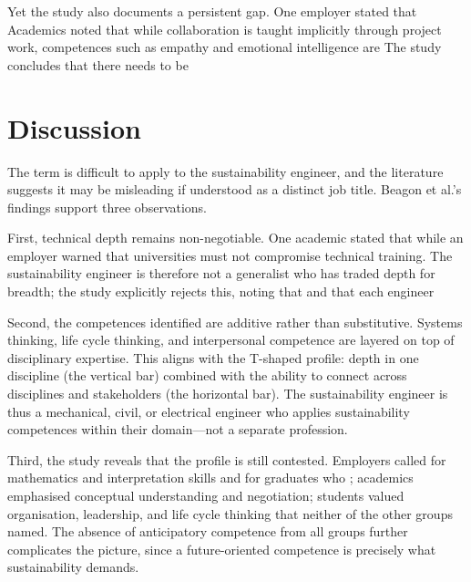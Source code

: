 \documentclass[11pt, a4paper]{article}
\begin{document}
Yet the study also documents a persistent gap. One employer stated that Academics noted that while
collaboration is taught implicitly through project work, competences such as empathy and emotional
intelligence are 
The study concludes that there needs to be 

\section{Discussion}
The term  is difficult to apply to the sustainability engineer, and the literature
suggests it may be misleading if understood as a distinct job title. Beagon et al.'s findings support
three observations.

First, technical depth remains non-negotiable. One academic stated that  while an employer warned that universities must not compromise technical training. The
 sustainability engineer is therefore not a generalist who has traded depth for
breadth; the study explicitly rejects this, noting that 
and that each engineer 

Second, the competences identified are additive rather than substitutive. Systems thinking, life
cycle thinking, and interpersonal competence are layered on top of disciplinary expertise. This
aligns with the T-shaped profile: depth in one discipline (the vertical bar) combined with the
ability to connect across disciplines and stakeholders (the horizontal bar). The 
sustainability engineer is thus a mechanical, civil, or electrical engineer who applies
sustainability competences within their domain—not a separate profession.

Third, the study reveals that the  profile is still contested. Employers called
for mathematics and interpretation skills and for graduates who ;
academics emphasised conceptual understanding and negotiation; students valued organisation,
leadership, and life cycle thinking that neither of the other groups named. The absence of
anticipatory competence from all groups further complicates the picture, since a future-oriented
competence is precisely what sustainability demands.
\end{document}

